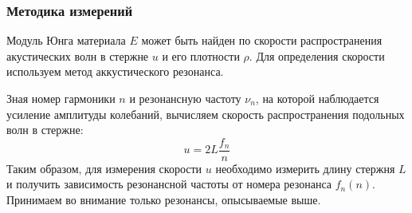\documentclass[a4paper,12pt]{article}
\begin{document}
	\subsubsection*{Методика измерений}
	Модуль Юнга материала $E$ может быть найден по скорости распространения акустических волн в стержне $u$ и его плотности $\rho$. Для определения скорости используем метод аккустического резонанса. 
	
	Зная номер гармоники $n$ и резонансную частоту $\nu_n$, на которой наблюдается усиление амплитуды колебаний, вычисляем скорость распространения подольных волн в стержне:
	$$
	u=2 L \frac{f_{n}}{n}
	$$
	Таким образом, для измерения скорости $u$ необходимо измерить длину	стержня $L$ и получить зависимость резонансной частоты от номера резонанса $f_n(n)$. Принимаем во внимание только резонансы, опысываемые выше.
	
\end{document}
